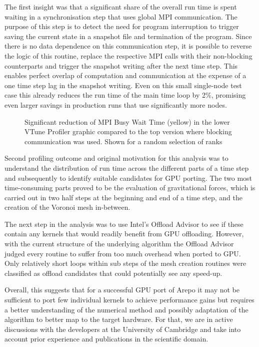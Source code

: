 The first insight was that a significant share of the overall run time is spent waiting in a synchronisation step that uses global MPI communication. The purpose of this step is to detect the need for program interruption to trigger saving the current state in a snapshot file and termination of the program. Since there is no data dependence on this communication step, it is possible to reverse the logic of this routine, replace the respective MPI calls with their non-blocking counterparts and trigger the snapshot writing after the next time step. This enables perfect overlap of computation and communication at the expense of a one time step lag in the snapshot writing. Even on this small single-node test case this already reduces the run time of the main time loop by 2\%, promising even larger savings in production runs that use significantly more nodes.

\begin{figure}[htp]
	\centering
	\caption{Significant reduction of MPI Busy Wait Time (yellow) in the lower VTune Profiler graphic compared to the top version where blocking communication was used. Shown for a random selection of ranks}
	\label{fig:arepo_mpicom}
\end{figure}

Second profiling outcome and original motivation for this analysis was to understand the distribution of run time across the different parts of a time step and subsequently to identify suitable candidates for GPU porting. The two most time-consuming parts proved to be the evaluation of gravitational forces, which is carried out in two half steps at the beginning and end of a time step, and the creation of the Voronoi mesh in-between.

The next step in the analysis was to use Intel's Offload Advisor to see if these contain any kernels that would readily benefit from GPU offloading. However, with the current structure of the underlying algorithm the Offload Advisor judged every routine to suffer from too much overhead when ported to GPU. Only relatively short loops within sub steps of the mesh creation routines were classified as offload candidates that could potentially see any speed-up.

Overall, this suggests that for a successful GPU port of Arepo it may not be sufficient to port few individual kernels to achieve performance gains but requires a better understanding of the numerical method and possibly adaptation of the algorithm to better map to the target hardware. For that, we are in active discussions with the developers at the University of Cambridge and take into account prior experience and publications in the scientific domain.

